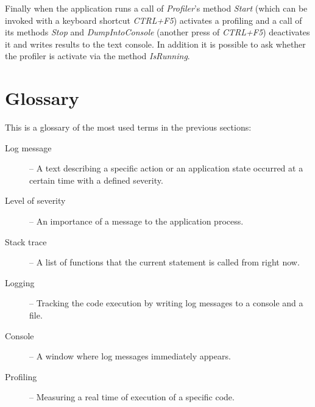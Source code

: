 Finally when the application runs a call of \emph{Profiler}'s method \emph{Start} (which can be invoked with a keyboard shortcut \emph{CTRL+F5}) activates a profiling and a call of its methods \emph{Stop} and \emph{DumpIntoConsole} (another press of \emph{CTRL+F5}) deactivates it and writes results to the text console. In addition it is possible to ask whether the profiler is activate via the method \emph{IsRunning}.

\section{Glossary}
This is a glossary of the most used terms in the previous sections:

\begin{description}
  \item[Log message] -- A text describing a specific action or an application state occurred at a certain time with a defined severity.
  \item[Level of severity] -- An importance of a message to the application process.
  \item[Stack trace] -- A list of functions that the current statement is called from right now.
  \item[Logging] -- Tracking the code execution by writing log messages to a console and a file.
  \item[Console] -- A window where log messages immediately appears.
  \item[Profiling] -- Measuring a real time of execution of a specific code.
\end{description}